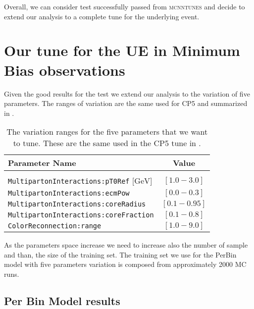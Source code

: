 Overall, we can consider test successfully passed from \textsc{mcnntunes} and decide to extend our analysis to a complete tune for the underlying event.


\section{Our tune for the UE in Minimum Bias observations}

Given the good results for the test we extend our analysis to the variation of five parameters. The ranges of variation are the same used for CP5 and summarized in .

\begin{table}[!htb]
\centering
\begin{tabular}{l | c }
Parameter Name & Value \\ 
\hline \hline
\\[-0.85em]
	\texttt{MultipartonInteractions:pT0Ref} [$\mathrm{GeV}$] & $[1.0 - 3.0]$\\
	\texttt{MultipartonInteractions:ecmPow} & $[0.0 - 0.3]$\\
	\texttt{MultipartonInteractions:coreRadius} & $[0.1 - 0.95 ]$\\
	\texttt{MultipartonInteractions:coreFraction} & $[ 0.1 - 0.8 ]$\\
	\texttt{ColorReconnection:range} & $[  1.0 - 9.0 ]$
\end{tabular}
\caption{The variation ranges for the five parameters that we want to tune. These are the same used in the CP5 tune in \cite{CPtunes}.}
\label{table:ranges5params}
\end{table}

\noindent As the parameters space increase we need to increase also the number of sample and than, the size of the training set. 
The training set we use for the PerBin model with five parameters variation is composed from approximately 2000 MC runs. 

\subsection{Per Bin Model results}

